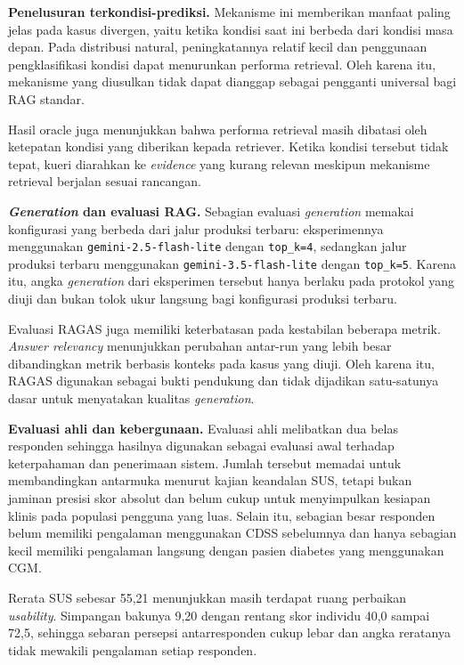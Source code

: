 \textbf{Penelusuran terkondisi-prediksi.} Mekanisme ini memberikan manfaat paling jelas pada kasus divergen, yaitu ketika kondisi saat ini berbeda dari kondisi masa depan.
Pada distribusi natural, peningkatannya relatif kecil dan penggunaan pengklasifikasi kondisi dapat menurunkan performa retrieval. Oleh karena itu,
mekanisme yang diusulkan tidak dapat dianggap sebagai pengganti universal bagi RAG standar.

Hasil oracle juga menunjukkan bahwa performa retrieval masih dibatasi oleh ketepatan kondisi yang diberikan kepada retriever. Ketika kondisi tersebut
tidak tepat, kueri diarahkan ke \textit{evidence} yang kurang relevan meskipun mekanisme retrieval berjalan sesuai rancangan.

\textbf{\textit{Generation} dan evaluasi RAG.} Sebagian evaluasi \textit{generation} memakai konfigurasi yang berbeda dari jalur produksi terbaru:
eksperimennya menggunakan \texttt{gemini-2.5-flash-lite} dengan \texttt{top\_k=4}, sedangkan jalur produksi terbaru menggunakan
\texttt{gemini-3.5-flash-lite} dengan \texttt{top\_k=5}. Karena itu, angka \textit{generation} dari eksperimen tersebut hanya berlaku pada protokol yang
diuji dan bukan tolok ukur langsung bagi konfigurasi produksi terbaru.

Evaluasi RAGAS juga memiliki keterbatasan pada kestabilan beberapa metrik. \textit{Answer relevancy} menunjukkan perubahan antar-run yang lebih besar
dibandingkan metrik berbasis konteks pada kasus yang diuji. Oleh karena itu, RAGAS digunakan sebagai bukti pendukung dan tidak dijadikan satu-satunya
dasar untuk menyatakan kualitas \textit{generation}.

\textbf{Evaluasi ahli dan kebergunaan.} Evaluasi ahli melibatkan dua belas responden sehingga hasilnya digunakan sebagai evaluasi awal terhadap keterpahaman dan penerimaan sistem. Jumlah
tersebut memadai untuk membandingkan antarmuka menurut kajian keandalan SUS, tetapi bukan jaminan presisi skor absolut dan belum cukup untuk menyimpulkan
kesiapan klinis pada populasi pengguna yang luas. Selain itu, sebagian besar responden belum memiliki pengalaman
menggunakan CDSS sebelumnya dan hanya sebagian kecil memiliki pengalaman langsung dengan pasien diabetes yang menggunakan CGM.

Rerata SUS sebesar 55,21 menunjukkan masih terdapat ruang perbaikan \textit{usability}. Simpangan bakunya 9,20 dengan rentang skor individu 40,0 sampai 72,5,
sehingga sebaran persepsi antarresponden cukup lebar dan angka reratanya tidak mewakili pengalaman setiap responden.

